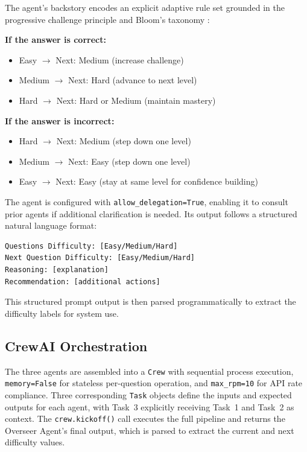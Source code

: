 \documentclass[conference]{IEEEtran}
\begin{document}
The agent's backstory encodes an explicit adaptive rule set grounded in the progressive challenge principle \cite{vygotsky1978} and Bloom's taxonomy \cite{bloom1956}:

\textbf{If the answer is correct:}
\begin{itemize}
    \item Easy $\rightarrow$ Next: Medium (increase challenge)
    \item Medium $\rightarrow$ Next: Hard (advance to next level)
    \item Hard $\rightarrow$ Next: Hard or Medium (maintain mastery)
\end{itemize}

\textbf{If the answer is incorrect:}
\begin{itemize}
    \item Hard $\rightarrow$ Next: Medium (step down one level)
    \item Medium $\rightarrow$ Next: Easy (step down one level)
    \item Easy $\rightarrow$ Next: Easy (stay at same level for confidence building)
\end{itemize}

The agent is configured with \texttt{allow\_delegation=True}, enabling it to consult prior agents if additional clarification is needed. Its output follows a structured natural language format:

\begin{verbatim}
Questions Difficulty: [Easy/Medium/Hard]
Next Question Difficulty: [Easy/Medium/Hard]
Reasoning: [explanation]
Recommendation: [additional actions]
\end{verbatim}

This structured prompt output is then parsed programmatically to extract the difficulty labels for system use.

\subsection{CrewAI Orchestration}

The three agents are assembled into a \texttt{Crew} with sequential process execution, \texttt{memory=False} for stateless per-question operation, and \texttt{max\_rpm=10} for API rate compliance. Three corresponding \texttt{Task} objects define the inputs and expected outputs for each agent, with Task~3 explicitly receiving Task~1 and Task~2 as context. The \texttt{crew.kickoff()} call executes the full pipeline and returns the Overseer Agent's final output, which is parsed to extract the current and next difficulty values.
\end{document}
